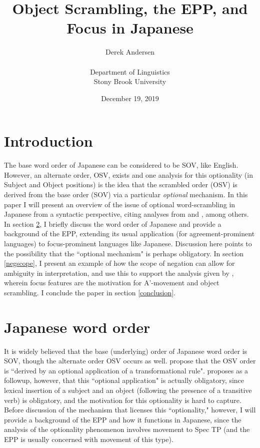 \documentclass{article}
\title{Object Scrambling, the EPP, and Focus in Japanese}
\author{Derek Andersen \\ \\
        Department of Linguistics \\
		Stony Brook University}
\date{December 19, 2019}
\begin{document}
\maketitle

\section{Introduction}
The base word order of Japanese can be considered to be SOV, like English. However, an alternate order, OSV, exists and one analysis for this optionality (in Subject and Object positions) is the idea that the scrambled order (OSV) is derived from the base order (SOV) via a particular \textit{optional} mechanism. In this paper I will present an overview of the issue of optional word-scrambling in Japanese from a syntactic perspective, citing analyses from \cite{Miyagawa2001} and \cite{Miyagawa2005}, among others. In section \ref{jpnwordorder}, I briefly discuss the word order of Japanese and provide a background of the EPP, extending its usual application (for agreement-prominent languages) to focus-prominent languages like Japanese. Discussion here points to the possibility that the ``optional mechanism" is perhaps obligatory. In section \ref{negscope}, I present an example of how the scope of negation can allow for ambiguity in interpretation, and use this to support the analysis given by \cite{Miyagawa2001}, wherein focus features are the motivation for A'-movement and object scrambling. I conclude the paper in section \ref{conclusion}.

\section{Japanese word order}
\label{jpnwordorder}
It is widely believed that the base (underlying) order of Japanese word order is SOV, though the alternate order OSV occurs as well. \cite{SaitoHoji1983} propose that the OSV order is “derived by an optional application of a transformational rule". \cite{Miyagawa2001} proposes as a followup, however, that this “optional application" is actually obligatory, since lexical insertion of a subject and an object (following the presence of a transitive verb) is obligatory, and the motivation for this optionality is hard to capture. Before discussion of the mechanism that licenses this “optionality," however, I will provide a background of the EPP and how it functions in Japanese, since the analysis of the optionality phenomenon involves movement to Spec TP (and the EPP is usually concerned with movement of this type).
\end{document}
